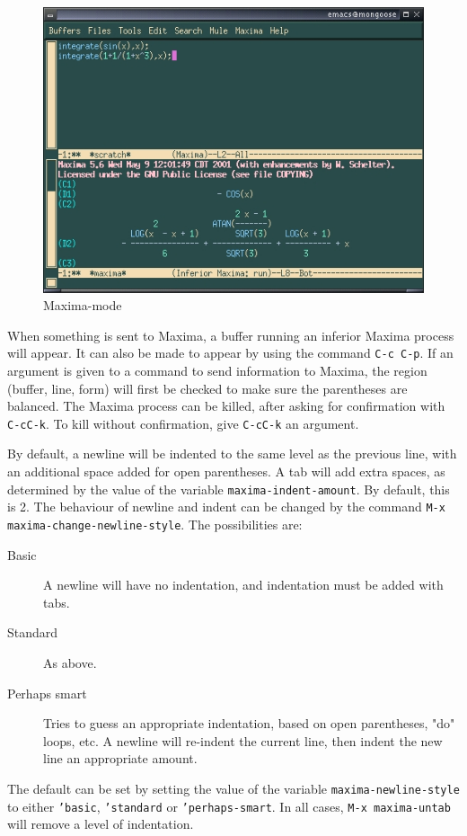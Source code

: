 \begin{figure}
\centering \includegraphics{images/emacsmaximamodeshot} 
\caption{Maxima-mode} 
\end{figure}

\noindent
When something is sent to Maxima, a buffer running an inferior Maxima 
process will appear.  It can also be made to appear by using the command
\texttt{C-c C-p}.
If an argument is given to a command to send information to Maxima,
the region (buffer, line, form) will first be checked to make sure
the parentheses are balanced.
The Maxima process can be killed, after asking for confirmation 
with \texttt{C-cC-k}.  To kill without confirmation, give \texttt{C-cC-k}
an argument.

By default, a newline will be indented to the same level as the 
previous line, with an additional space added for open parentheses.
A tab will add extra spaces, as determined by the value of the 
variable \texttt{maxima-indent-amount}.  By default, this is 2.
The behaviour of newline and indent can be changed by the command 
\texttt{M-x maxima-change-newline-style}.  The possibilities are:
\begin{description}
\item[Basic] A newline will have no indentation, and indentation
               must be added with tabs.
\item[Standard]      As above.
\item[Perhaps smart] Tries to guess an appropriate indentation, based on
               open parentheses, "do" loops, etc.
               A newline will re-indent the current line, then indent
               the new line an appropriate amount.
\end{description}
The default can be set by setting the value of the variable 
\texttt{maxima-newline-style} to either \texttt{'basic}, 
\texttt{'standard} or \texttt{'perhaps-smart}.
In all cases, \texttt{M-x maxima-untab} will remove a level of indentation.

